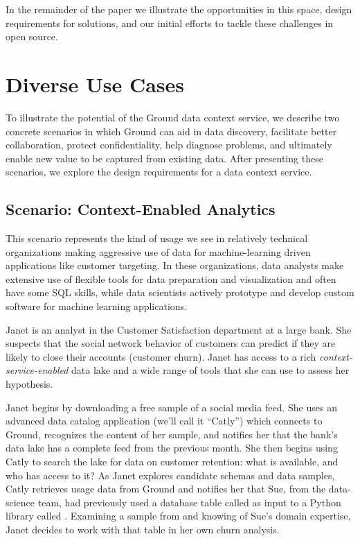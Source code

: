 \documentclass{cidr-2017}
\begin{document}
In the remainder of the paper we illustrate the opportunities in this space, design requirements for solutions, and our initial efforts to tackle these challenges in open source.

\section{Diverse Use Cases}
\label{sec:scenarios}
To illustrate the potential of the Ground data context service, we describe two concrete scenarios in which Ground
can aid in data discovery, facilitate better collaboration, protect confidentiality, help diagnose problems, and ultimately enable new value to be captured from existing data.
After presenting these scenarios, we explore the design requirements for a data context service.


\subsection{Scenario: Context-Enabled Analytics }
This scenario represents the kind of usage we see in relatively technical organizations making aggressive use of data for machine-learning driven applications like customer targeting. In these organizations, data analysts make extensive use of flexible tools for data preparation and visualization and often have some SQL skills, while data scientists actively prototype and develop custom software for machine learning applications.

Janet is an 
analyst in the Customer Satisfaction department at a large bank. 
She suspects that the social network behavior of customers can predict if they are likely to close their accounts (customer churn).
Janet has access to a rich \emph{context-service-enabled} data lake and a wide range of tools that she can use 
to assess her hypothesis. 

Janet 
begins by downloading a free sample of a social media feed.
She uses an advanced data catalog application (we'll call it ``Catly'') which connects to Ground, recognizes the content of her sample,
and notifies her that the bank's data lake has a complete feed from the previous month. 
She then begins using Catly to search the lake for data on customer retention: what is available, and who has access to it?  
As Janet explores candidate schemas and data samples, Catly retrieves usage data from Ground and notifies her that Sue, from the data-science team, had previously used a database table called  as input to a Python library called .
Examining a sample from  and knowing of Sue's domain expertise, Janet decides to work with that table in her own churn analysis. 
\end{document}
